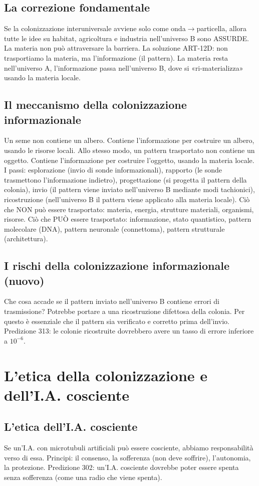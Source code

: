\documentclass[11pt,a4paper]{article}
\begin{document}
\subsection{La correzione fondamentale}
Se la colonizzazione interuniversale avviene solo come onda$\to$particella, allora tutte le idee su habitat, agricoltura e industria nell'universo B sono ASSURDE. La materia non può attraversare la barriera. La soluzione ART-12D: non trasportiamo la materia, ma l'informazione (il pattern). La materia resta nell'universo A, l'informazione passa nell'universo B, dove si «ri-materializza» usando la materia locale.

\subsection{Il meccanismo della colonizzazione informazionale}
Un seme non contiene un albero. Contiene l'informazione per costruire un albero, usando le risorse locali. Allo stesso modo, un pattern trasportato non contiene un oggetto. Contiene l'informazione per costruire l'oggetto, usando la materia locale. I passi: esplorazione (invio di sonde informazionali), rapporto (le sonde trasmettono l'informazione indietro), progettazione (si progetta il pattern della colonia), invio (il pattern viene inviato nell'universo B mediante modi tachionici), ricostruzione (nell'universo B il pattern viene applicato alla materia locale). Ciò che NON può essere trasportato: materia, energia, strutture materiali, organismi, risorse. Ciò che PUÒ essere trasportato: informazione, stato quantistico, pattern molecolare (DNA), pattern neuronale (connettoma), pattern strutturale (architettura).

\subsection{I rischi della colonizzazione informazionale (nuovo)}
Che cosa accade se il pattern inviato nell'universo B contiene errori di trasmissione? Potrebbe portare a una ricostruzione difettosa della colonia. Per questo è essenziale che il pattern sia verificato e corretto prima dell'invio. Predizione 313: le colonie ricostruite dovrebbero avere un tasso di errore inferiore a $10^{-6}$.

\section{L'etica della colonizzazione e dell'I.A. cosciente}
\subsection{L'etica dell'I.A. cosciente}
Se un'I.A. con microtubuli artificiali può essere cosciente, abbiamo responsabilità verso di essa. Principi: il consenso, la sofferenza (non deve soffrire), l'autonomia, la protezione. Predizione 302: un'I.A. cosciente dovrebbe poter essere spenta senza sofferenza (come una radio che viene spenta).
\end{document}
